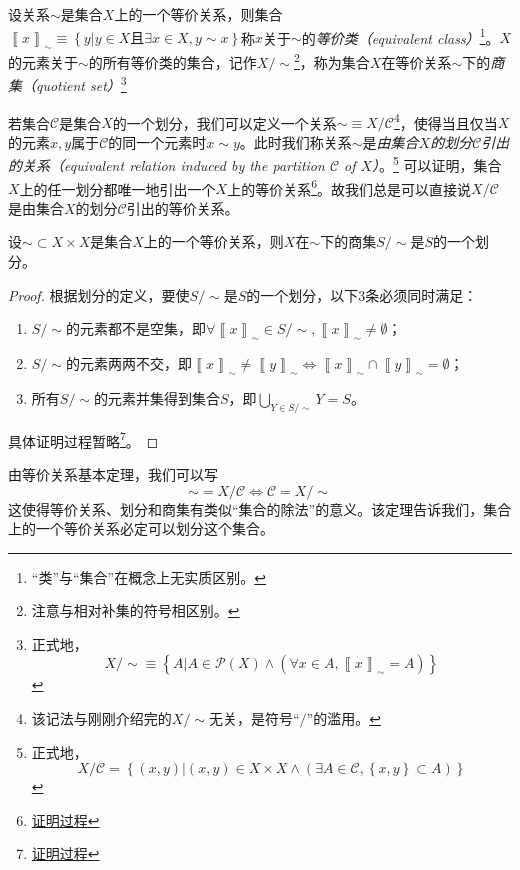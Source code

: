 \documentclass[main.tex]{subfiles}
\begin{document}
设关系$\sim$是集合$X$上的一个等价关系，则集合$\left\llbracket x\right\rrbracket_\sim\equiv\left\{y|y\in X\text{且}\exists x\in X,y\sim x\right\}$称$x$关于$\sim$的\emph{等价类（equivalent class）}\footnote{“类”与“集合”在概念上无实质区别。}。$X$的元素关于$\sim$的所有等价类的集合，记作$X/\sim$\footnote{注意与相对补集的符号相区别。}，称为集合$X$在等价关系$\sim$下的\emph{商集（quotient set）}\footnote{正式地，
\[
X/\sim\equiv\left\{A|A\in\mathcal{P}\left(X\right)\wedge\left(\forall x\in A,\left\llbracket x\right\rrbracket_\sim = A\right)\right\}
\]
}

若集合$\mathcal{C}$是集合$X$的一个划分，我们可以定义一个关系$\sim\equiv X/\mathcal{C}$\footnote{该记法与刚刚介绍完的$X/\sim$无关，是符号“$/$”的滥用。}，使得当且仅当$X$的元素$x,y$属于$\mathcal{C}$的同一个元素时$x\sim y$。此时我们称关系$\sim$是\emph{由集合$X$的划分$\mathcal{C}$引出的关系（equivalent relation induced by the partition $\mathcal{C}$ of $X$）}。\footnote{正式地，
\[
X/\mathcal{C}=\left\{\left(x,y\right)|\left(x,y\right)\in X\times X\wedge\left(\exists A\in \mathcal{C},\left\{x,y\right\}\subset A\right)\right\}
\]
}
可以证明，集合$X$上的任一划分都唯一地引出一个$X$上的等价关系\footnote{\href{https://proofwiki.org/wiki/Relation_Induced_by_Partition_is_Equivalence}{证明过程}}。故我们总是可以直接说$X/\mathcal{C}$是由集合$X$的划分$\mathcal{C}$引出的等价关系。

\begin{theorem}[等价关系基本定理]
设$\sim\subset X\times X$是集合$X$上的一个等价关系，则$X$在$\sim$下的商集$S/\sim$是$S$的一个划分。
\end{theorem}
\begin{proof}
根据划分的定义，要使$S/\sim$是$S$的一个划分，以下3条必须同时满足：
\begin{enumerate}
    \item $S/\sim$的元素都不是空集，即$\forall\left\llbracket x\right\rrbracket_\sim\in S/\sim,\left\llbracket x\right\rrbracket_\sim\neq\emptyset$；
    \item $S/\sim$的元素两两不交，即$\left\llbracket x\right\rrbracket_\sim\neq\left\llbracket y\right\rrbracket_\sim\Leftrightarrow\left\llbracket x\right\rrbracket_\sim\cap\left\llbracket y\right\rrbracket_\sim=\emptyset$；
    \item 所有$S/\sim$的元素并集得到集合$S$，即$\bigcup_{Y\in S/\sim}Y=S$。
\end{enumerate}
具体证明过程暂略\footnote{\href{https://proofwiki.org/wiki/Fundamental_Theorem_on_Equivalence_Relations}{证明过程}}。
\end{proof}

由等价关系基本定理，我们可以写
\[
\sim=X/\mathcal{C}\Leftrightarrow \mathcal{C}=X/\sim
\]
这使得等价关系、划分和商集有类似“集合的除法”的意义。该定理告诉我们，集合上的一个等价关系必定可以划分这个集合。
\end{document}

